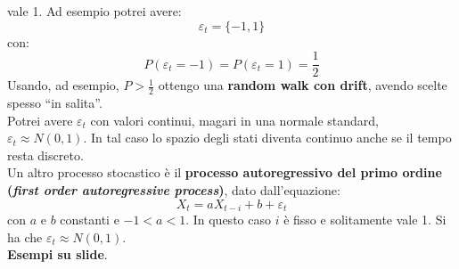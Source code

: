 \documentclass[a4paper,12pt, oneside]{book}
\begin{document}
vale 1. Ad esempio potrei avere:
\[\varepsilon_t=\{-1,1\}\]
con:
\[P(\varepsilon_t=-1)=P(\varepsilon_t=1)=\frac{1}{2}\]
Usando, ad esempio, $P>\frac{1}{2}$ ottengo una \textbf{random walk con drift},
avendo scelte spesso ``in salita''.\\
Potrei avere $\varepsilon_t$ con valori continui, magari in una normale
standard, $\varepsilon_t\approx N(0,1)$. In tal caso lo spazio degli stati
diventa continuo anche se il tempo resta discreto.\\
Un altro processo stocastico è il \textbf{processo autoregressivo del primo
  ordine (\textit{first order autoregressive process})}, dato dall'equazione:
\[X_t=aX_{t-i}+b+\varepsilon_t\]
con $a$ e $b$ constanti e $-1<a<1$. In questo caso $i$ è fisso e solitamente
vale 1. Si ha che $\varepsilon_t\approx N(0,1)$.\\
\textbf{Esempi su slide}.
\end{document}
